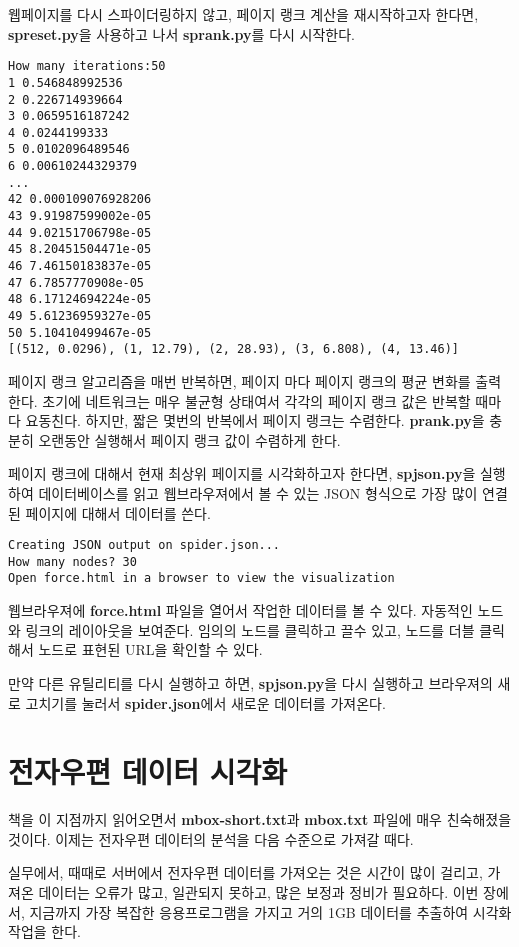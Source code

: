 웹페이지를 다시 스파이더링하지 않고, 페이지 랭크 계산을 재시작하고자 한다면,
{\bf spreset.py}을 사용하고 나서 {\bf sprank.py}를 다시 시작한다.

\beforeverb
\begin{verbatim}
How many iterations:50
1 0.546848992536
2 0.226714939664
3 0.0659516187242
4 0.0244199333
5 0.0102096489546
6 0.00610244329379
...
42 0.000109076928206
43 9.91987599002e-05
44 9.02151706798e-05
45 8.20451504471e-05
46 7.46150183837e-05
47 6.7857770908e-05
48 6.17124694224e-05
49 5.61236959327e-05
50 5.10410499467e-05
[(512, 0.0296), (1, 12.79), (2, 28.93), (3, 6.808), (4, 13.46)]
\end{verbatim}
\afterverb
%

페이지 랭크 알고리즘을 매번 반복하면, 페이지 마다 페이지 랭크의 평균 변화를 출력한다.
초기에 네트워크는 매우 불균형 상태여서 각각의 페이지 랭크 값은 반복할 때마다 요동친다.
하지만, 짧은 몇번의 반복에서 페이지 랭크는 수렴한다.
{\bf prank.py}을 충분히 오랜동안 실행해서 페이지 랭크 값이 수렴하게 한다.

페이지 랭크에 대해서 현재 최상위 페이지를 시각화하고자 한다면, 
{\bf spjson.py}을 실행하여 데이터베이스를 읽고 웹브라우져에서 볼 수 있는 JSON 형식으로 
가장 많이 연결된 페이지에 대해서 데이터를 쓴다.

\beforeverb
\begin{verbatim}
Creating JSON output on spider.json...
How many nodes? 30
Open force.html in a browser to view the visualization
\end{verbatim}
\afterverb
%

웹브라우져에 {\bf force.html} 파일을 열어서 작업한 데이터를 볼 수 있다.
자동적인 노드와 링크의 레이아웃을 보여준다. 
임의의 노드를 클릭하고 끌수 있고, 노드를 더블 클릭해서 노드로 표현된 URL을 확인할 수 있다.

만약 다른 유틸리티를 다시 실행하고 하면, {\bf spjson.py}을 다시 실행하고 브라우져의 새로 고치기를 눌러서
{\bf spider.json}에서 새로운 데이터를 가져온다.


\section{전자우편 데이터 시각화}

책을 이 지점까지 읽어오면서 
{\bf mbox-short.txt}과 {\bf mbox.txt} 파일에 매우 친숙해졌을 것이다.
이제는 전자우편 데이터의 분석을 다음 수준으로 가져갈 때다.

실무에서, 때때로 서버에서 전자우편 데이터를 가져오는 것은
시간이 많이 걸리고, 가져온 데이터는 오류가 많고, 일관되지 못하고, 많은 보정과 정비가 필요하다.
이번 장에서, 지금까지 가장 복잡한 응용프로그램을 가지고 거의 1GB 데이터를 추출하여 시각화 작업을 한다.

